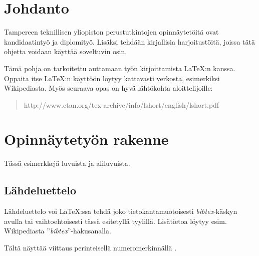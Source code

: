 \documentclass[12pt,a4paper,finnish]{vendor/tutthesis}
\begin{document}




\renewcommand\contentsname{Sisällys} %
\tableofcontents


\renewcommand{\chaptermark}[1]{\markboth{\thechapter. \ #1}{}}
\renewcommand{\sectionmark}[1]{\markright{}{}}
\lhead{\fancyplain{}{\leftmark}}


\chapter{Johdanto}

Tampereen teknillisen yliopiston perustutkintojen opinnäytetöitä ovat
kandidaatintyö ja diplomityö. Lisäksi tehdään kirjallisia
harjoitustöitä, joissa tätä ohjetta voidaan käyttää soveltuvin osin.

Tämä pohja on tarkoitettu auttamaan työn kirjoittamista \LaTeX:n
kanssa. Oppaita itse \LaTeX:n käyttöön löytyy kattavasti verkosta,
esimerkiksi Wikipediasta. Myös seuraava opas on hyvä lähtökohta
aloittelijoille:
\begin{quote}
http://www.ctan.org/tex-archive/info/lshort/english/lshort.pdf
\end{quote}

\chapter{Opinnäytetyön rakenne}

Tässä esimerkkejä luvuista ja aliluvuista.

\section{Lähdeluettelo}

Lähdeluettelo voi \LaTeX:ssa tehdä joko tietokantamuotoisesti
\textit{bibtex}-käskyn avulla tai vaihtoehtoisesti tässä esitetyllä tyylillä.
Lisätietoa löytyy esim. Wikipediasta ''\textit{bibtex}''-hakusanalla.

Tältä näyttää viittaus perinteisellä numeromerkinnällä \cite{Hirs,Mittelbach}.

%
%
\end{document}
